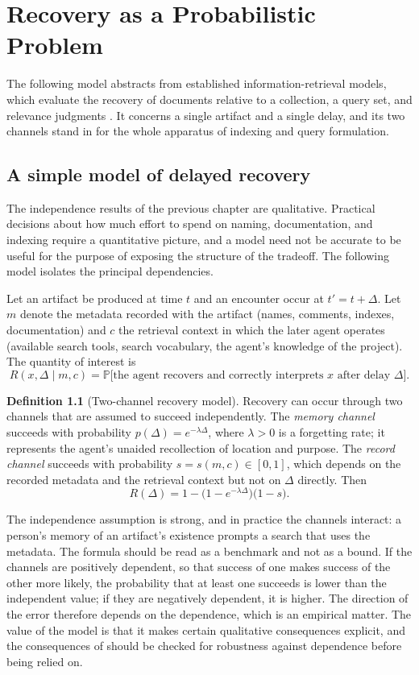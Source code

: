 \documentclass[11pt,twoside,openright]{book}
\theoremstyle{plain}
\theoremstyle{definition}
\newtheorem{definition}[theorem]{Definition}
\theoremstyle{remark}
\newcommand{\Prob}{\mathbb{P}}
\begin{document}
\chapter{Recovery as a Probabilistic Problem}\label{ch:recovery}

The following model abstracts from established information-retrieval models, which evaluate the recovery of documents relative to a collection, a query set, and relevance judgments \cite{manning2008}. It concerns a single artifact and a single delay, and its two channels stand in for the whole apparatus of indexing and query formulation.

\section{A simple model of delayed recovery}

The independence results of the previous chapter are qualitative. Practical decisions about how much effort to spend on naming, documentation, and indexing require a quantitative picture, and a model need not be accurate to be useful for the purpose of exposing the structure of the tradeoff. The following model isolates the principal dependencies.

Let an artifact be produced at time $t$ and an encounter occur at $t'=t+\Delta$. Let $m$ denote the metadata recorded with the artifact (names, comments, indexes, documentation) and $c$ the retrieval context in which the later agent operates (available search tools, search vocabulary, the agent's knowledge of the project). The quantity of interest is
\[
R(x,\Delta\mid m,c)=\Prob\bigl[\text{the agent recovers and correctly interprets }x\text{ after delay }\Delta\bigr].
\]

\begin{definition}[Two-channel recovery model]\label{def:twochannel}
Recovery can occur through two channels that are assumed to succeed independently. The \emph{memory channel} succeeds with probability $p(\Delta)=e^{-\lambda\Delta}$, where $\lambda>0$ is a forgetting rate; it represents the agent's unaided recollection of location and purpose. The \emph{record channel} succeeds with probability $s=s(m,c)\in[0,1]$, which depends on the recorded metadata and the retrieval context but not on $\Delta$ directly. Then
\[
R(\Delta)=1-\bigl(1-e^{-\lambda\Delta}\bigr)\bigl(1-s\bigr).
\]
\end{definition}

The independence assumption is strong, and in practice the channels interact: a person's memory of an artifact's existence prompts a search that uses the metadata. The formula should be read as a benchmark and not as a bound. If the channels are positively dependent, so that success of one makes success of the other more likely, the probability that at least one succeeds is lower than the independent value; if they are negatively dependent, it is higher. The direction of the error therefore depends on the dependence, which is an empirical matter. The value of the model is that it makes certain qualitative consequences explicit, and the consequences of  should be checked for robustness against dependence before being relied on.
\end{document}

